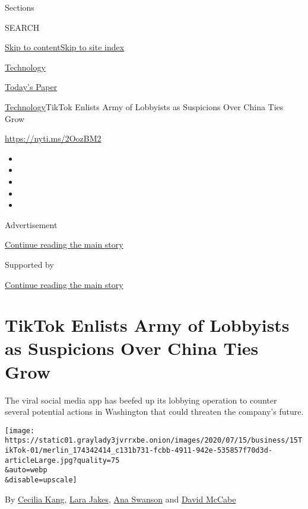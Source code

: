 Sections

SEARCH

\protect\hyperlink{site-content}{Skip to
content}\protect\hyperlink{site-index}{Skip to site index}

\href{https://www.nytimes3xbfgragh.onion/section/technology}{Technology}

\href{https://myaccount.nytimes3xbfgragh.onion/auth/login?response_type=cookie\&client_id=vi}{}

\href{https://www.nytimes3xbfgragh.onion/section/todayspaper}{Today's
Paper}

\href{/section/technology}{Technology}\textbar{}TikTok Enlists Army of
Lobbyists as Suspicions Over China Ties Grow

\href{https://nyti.ms/2OozBM2}{https://nyti.ms/2OozBM2}

\begin{itemize}
\item
\item
\item
\item
\item
\end{itemize}

Advertisement

\protect\hyperlink{after-top}{Continue reading the main story}

Supported by

\protect\hyperlink{after-sponsor}{Continue reading the main story}

\hypertarget{tiktok-enlists-army-of-lobbyists-as-suspicions-over-china-ties-grow}{%
\section{TikTok Enlists Army of Lobbyists as Suspicions Over China Ties
Grow}\label{tiktok-enlists-army-of-lobbyists-as-suspicions-over-china-ties-grow}}

The viral social media app has beefed up its lobbying operation to
counter several potential actions in Washington that could threaten the
company's future.

\texttt{[image: https://static01.graylady3jvrrxbe.onion/images/2020/07/15/business/15TikTok-01/merlin\_174342414\_c131b731-fcbb-4911-942e-535857f70d3d-articleLarge.jpg?quality=75\\\&auto=webp\\\&disable=upscale]}

By \href{https://www.nytimes3xbfgragh.onion/by/cecilia-kang}{Cecilia
Kang}, \href{https://www.nytimes3xbfgragh.onion/by/lara-jakes}{Lara
Jakes}, \href{https://www.nytimes3xbfgragh.onion/by/ana-swanson}{Ana
Swanson} and
\href{https://www.nytimes3xbfgragh.onion/by/david-mccabe}{David McCabe}

